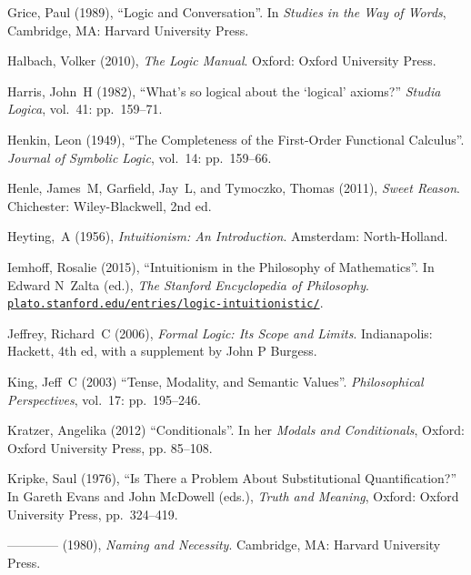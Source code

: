 \documentclass[openany,leqno,10pt]{book}
\theoremstyle{break}
\theoremstyle{definition}
\theoremstyle{remark}
\begin{document}
{\begin{thebibliography}{39}
Grice, Paul (1989), \enquote{Logic and Conversation}. In \emph{Studies in the
  Way of Words}, Cambridge, MA: Harvard University Press.

Halbach, Volker (2010), \emph{The Logic Manual}. Oxford: Oxford University
  Press.

Harris, John~H (1982), \enquote{What's so logical about the `logical' axioms?}
  \emph{Studia Logica}, vol.~41: pp.~159–71.

Henkin, Leon (1949), \enquote{The Completeness of the First-Order Functional
  Calculus}. \emph{Journal of Symbolic Logic}, vol.~14: pp.~159–66.

Henle, James~M, Garfield, Jay~L, and Tymoczko, Thomas (2011), \emph{Sweet Reason}. Chichester: Wiley-Blackwell, 2nd ed.


Heyting,~A (1956), \emph{Intuitionism: An Introduction}. Amsterdam:
  North-Holland.

 Iemhoff, Rosalie (2015), \enquote{Intuitionism in the Philosophy of Mathematics}. In Edward N~Zalta (ed.), \emph{The Stanford Encyclopedia of Philosophy}. \href{http://plato.stanford.edu/entries/logic-intuitionistic/}{\nolinkurl{plato.stanford.edu/entries/logic-intuitionistic/}}.

Jeffrey, Richard~C (2006), \emph{Formal Logic: Its Scope and Limits}. Indianapolis: Hackett, 4th ed, with a supplement by John P Burgess.

King, Jeff~C (2003) \enquote{Tense, Modality, and Semantic Values}. \emph{Philosophical Perspectives}, vol.~17: pp.~195–246. 

Kratzer, Angelika (2012) \enquote{Conditionals}. In her \emph{Modals and Conditionals}, Oxford: Oxford University Press, pp. 85–108.

Kripke, Saul (1976), \enquote{Is There a Problem About Substitutional
  Quantification?} In Gareth Evans and John McDowell (eds.), \emph{Truth and
  Meaning}, Oxford: Oxford University Press, pp.~324–419.

---\!\!---\!\!---\!\!--- (1980), \emph{Naming and Necessity}. Cambridge, MA:
  Harvard University Press.


\end{thebibliography}}
\end{document}

